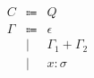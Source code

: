 \documentclass[12pt]{article}
\begin{document}
\pagestyle{empty}

\begin{align*}
    \begin{array}{rcl}
        C
        &\Coloneqq &Q \\
        \Gamma
        &\Coloneqq &\epsilon \\
        &\mid &\Gamma_1 + \Gamma_2 \\
        &\mid & x: \sigma
    \end{array}
\end{align*}
\end{document}
